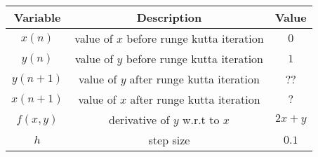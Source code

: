 \begin{tabular}[12.1pt]{ |c| c| c|}
    \hline
    \textbf{Variable} & \textbf{Description} &\textbf{Value}\\ 
    \hline
    $x(n)$ & value of $x$ before runge kutta iteration & $0$ \\
    \hline 
    $y(n)$ & value of $y$ before runge kutta iteration  &$1$ \\
    \hline 
    $y(n+1)$ & value of $y$ after runge kutta iteration & $?$?\\
    \hline
   $x(n+1)$ & value of $x$ after runge kutta iteration  & $?$\\
   \hline
   $f(x,y)$ &derivative of $y$ w.r.t to $x$ & $2x+y$\\
   \hline
   $h$ & step size & $0.1$\\
   \hline
    \end{tabular}
